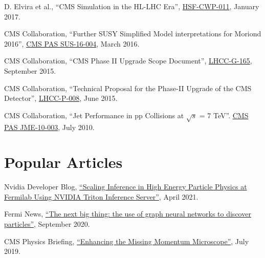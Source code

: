 \begin{description}[leftmargin=12pt,font=\normalfont,labelsep=0em]
\item D. Elvira et al., ``CMS Simulation in the HL-LHC Era'', \href{http://hepsoftwarefoundation.org/cwp-whitepapers.html}{HSF-CWP-011}, January 2017.
\item CMS Collaboration, ``Further SUSY Simplified Model interpretations for Moriond 2016'', \href{http://cds.cern.ch/record/2140312}{CMS PAS SUS-16-004}, March 2016.
\item CMS Collaboration, ``CMS Phase II Upgrade Scope Document'', \href{https://cds.cern.ch/record/2055167}{LHCC-G-165}, September 2015.
\item CMS Collaboration, ``Technical Proposal for the Phase-II Upgrade of the CMS Detector'', \href{http://cds.cern.ch/record/2020886}{LHCC-P-008}, June 2015.
\item CMS Collaboration, ``Jet Performance in pp Collisions at $\sqrt{s}$ = 7 TeV''. \href{http://cds.cern.ch/record/1279362}{CMS PAS JME-10-003}, July 2010.
\end{description}

\section{Popular Articles}
\begin{description}[leftmargin=12pt,font=\normalfont,labelsep=0em]
\item Nvidia Developer Blog, \href{https://developer.nvidia.com/blog/scaling-inference-in-high-energy-particle-physics-at-fermilab-using-nvidia-triton-inference-server/}{``Scaling Inference in High Energy Particle Physics at Fermilab Using NVIDIA Triton Inference Server''}, April 2021.
\item Fermi News, \href{https://news.fnal.gov/2020/09/the-next-big-thing-the-use-of-graph-neural-networks-to-discover-particles/}{``The next big thing: the use of graph neural networks to discover particles''}, September 2020.
\item CMS Physics Briefing, \href{https://cms.cern/news/enhancing-missing-momentum-microscope}{``Enhancing the Missing Momentum Microscope''}, July 2019.
\end{description}

\ifdefined\longflag
{}
